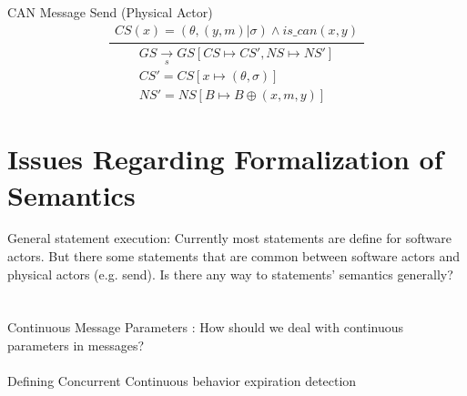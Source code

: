 \documentclass[]{article}
\begin{document}
\\\\
CAN Message Send (Physical Actor)
\begin{equation}
\frac
{
	\begin{gathered}
	CS(x) = (\theta, (y,m)|\sigma)  \wedge is\_can(x,y) 
	\end{gathered}
}
{
	\begin{gathered}
	GS\xrightarrow[s]{}GS[CS\longmapsto CS', NS\longmapsto NS'] \\
	CS'=CS[x \longmapsto(\theta,\sigma)]\\
	NS' = NS[B\longmapsto B \oplus (x,m,y)]
	\end{gathered}
}
\end{equation}

\section{Issues Regarding Formalization of Semantics}
General statement execution: Currently most statements are define for software actors. But there some statements that are common between software actors and physical actors (e.g. send). Is there any way to statements' semantics generally? \\ \\
 \\
Continuous Message Parameters : How should we deal with continuous parameters in messages? \\ \\
Defining  Concurrent Continuous behavior expiration detection \\ \\
\end{document}
